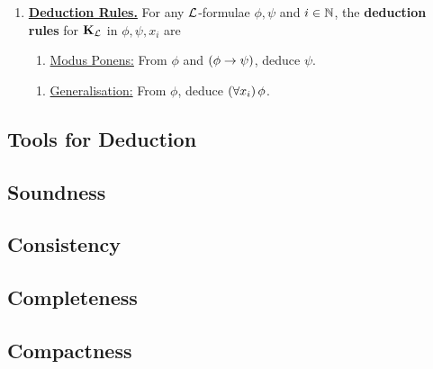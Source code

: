\begin{boxdefinition}
\begin{enumerate}
        \item \textbf{\underline{Deduction Rules.}} For any $\mathcal{L}$-formulae $\phi, \psi$ and $i \in \mathbb{N}$, the \textbf{deduction rules} for $\mathbf{K}_{\mathcal{L}}$ in $\phi, \psi, x_i$ are
        \begin{enumerate}[label = \normalfont (MP)]
            \item\label{FO:MP}
            \underline{Modus Ponens:} From $\phi$ and $\left( \phi \to \psi \right)$, deduce $\psi$.
        \end{enumerate}
        \begin{enumerate}[label = \normalfont (Gen)]
            \item\label{FO:Gen}
            \underline{Generalisation:} From $\phi$, deduce $\left( \forall x_i \right)\phi$.
        \end{enumerate}
    \end{enumerate}
\end{boxdefinition}

\sorry %

\subsection{Tools for Deduction}

\subsection{Soundness}

\subsection{Consistency}


\subsection{Completeness}

\subsection{Compactness}
